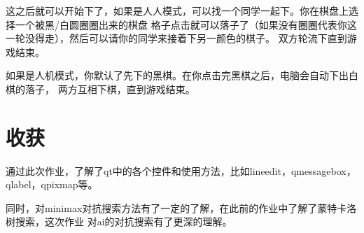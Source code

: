 \documentclass[UTF8]{ctexart}
\begin{document}
这之后就可以开始下了，如果是人人模式，可以找一个同学一起下。你在棋盘上选择一个被黑/白圆圈圈出来的棋盘
格子点击就可以落子了（如果没有圈圈代表你这一轮没得走），然后可以请你的同学来接着下另一颜色的棋子。
双方轮流下直到游戏结束。

如果是人机模式，你默认了先下的黑棋。在你点击完黑棋之后，电脑会自动下出白棋的落子，
两方互相下棋，直到游戏结束。
\section{收获}

通过此次作业，了解了qt中的各个控件和使用方法，比如lineedit，qmessagebox，qlabel，qpixmap等。


同时，对minimax对抗搜索方法有了一定的了解，在此前的作业中了解了蒙特卡洛树搜索，这次作业
对ai的对抗搜索有了更深的理解。
\end{document}
